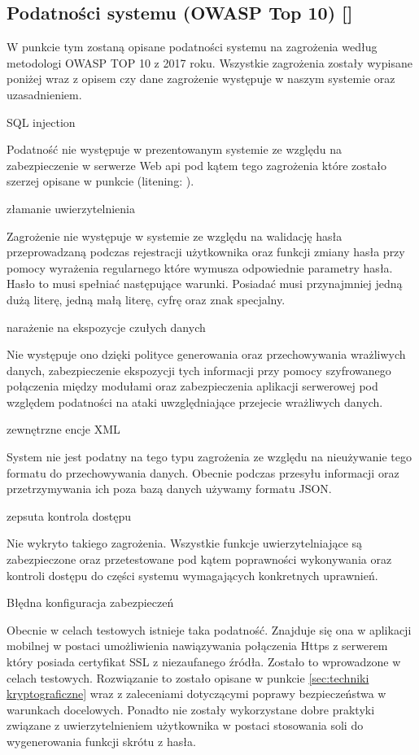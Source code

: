 \subsection{Podatności systemu (OWASP Top 10) [\StudentA]} \label{sec:OWASP}
W punkcie tym zostaną opisane podatności systemu na zagrożenia według metodologi OWASP TOP 10 z 2017 roku. Wszystkie zagrożenia zostały wypisane poniżej wraz z opisem czy dane zagrożenie występuje w naszym systemie oraz uzasadnieniem.
\begin{enumerate*}
	\item SQL injection 
	
	 Podatność nie występuje w prezentowanym systemie ze względu na zabezpieczenie w serwerze Web api pod kątem tego zagrożenia które zostało szerzej opisane w punkcie (litening: ).
	\item złamanie uwierzytelnienia 
	
	 Zagrożenie nie występuje w systemie ze względu na walidację hasła przeprowadzaną podczas rejestracji użytkownika oraz funkcji zmiany hasła przy pomocy wyrażenia regularnego które wymusza odpowiednie parametry hasła. Hasło to musi spełniać następujące warunki. Posiadać musi przynajmniej jedną dużą literę, jedną małą literę,  cyfrę oraz znak specjalny.
	\item narażenie na ekspozycje czułych danych 
	
	 Nie występuje ono dzięki polityce generowania oraz przechowywania wrażliwych danych,  zabezpieczenie ekspozycji tych informacji przy pomocy szyfrowanego połączenia między modułami oraz zabezpieczenia aplikacji serwerowej pod względem podatności na ataki uwzględniające przejecie wrażliwych danych.
	\item zewnętrzne encje XML 
	
	 System \NazwaSys \space nie jest podatny na tego typu zagrożenia ze względu na nieużywanie tego formatu do przechowywania danych. Obecnie podczas przesyłu informacji oraz przetrzymywania ich poza bazą danych używamy formatu JSON.
	\item zepsuta kontrola dostępu 
	
	 Nie wykryto takiego zagrożenia. Wszystkie funkcje uwierzytelniające są zabezpieczone oraz przetestowane pod kątem poprawności wykonywania oraz kontroli dostępu do części systemu wymagających konkretnych uprawnień.
	 \item Błędna konfiguracja zabezpieczeń
	 
	 Obecnie w celach testowych istnieje taka podatność. Znajduje się ona w aplikacji mobilnej w  postaci umożliwienia nawiązywania połączenia Https z serwerem który posiada certyfikat SSL z niezaufanego źródła. Zostało to wprowadzone w celach testowych. Rozwiązanie to zostało opisane w punkcie \ref{sec:techniki kryptograficzne} wraz z zaleceniami dotyczącymi poprawy bezpieczeństwa w warunkach docelowych. Ponadto nie zostały wykorzystane dobre praktyki związane z uwierzytelnieniem użytkownika w postaci stosowania soli do wygenerowania funkcji skrótu z hasła.
	 

\end{enumerate*}
